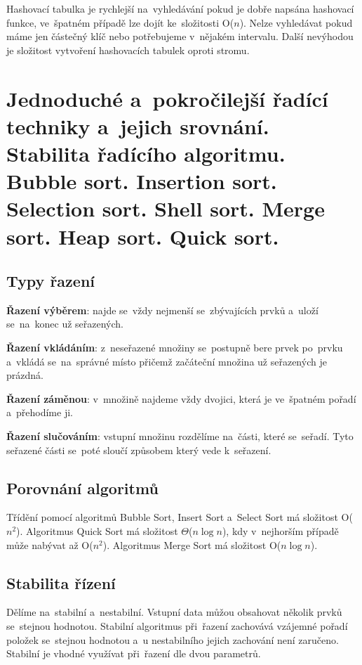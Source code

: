 Hashovací tabulka je rychlejší na~vyhledávání pokud je dobře napsána hashovací funkce, ve~špatném případě lze dojít ke~složitosti O(\( n \)). Nelze vyhledávat pokud máme jen částečný klíč nebo potřebujeme v~nějakém intervalu. Další nevýhodou je složitost vytvoření hashovacích tabulek oproti stromu.

\clearpage
\section{Jednoduché a~pokročilejší řadící techniky a~jejich srovnání. Stabilita řadícího algoritmu. Bubble sort. Insertion sort. Selection sort. Shell sort. Merge sort. Heap sort. Quick sort.}

\subsection{Typy řazení}

\textbf{Řazení výběrem}: najde se~vždy nejmenší se~zbývajících prvků a~uloží se~na~konec už seřazených.

\textbf{Řazení vkládáním}: z~neseřazené množiny se~postupně bere prvek po~prvku a~vkládá se~na~správné místo přičemž začáteční množina už seřazených je prázdná.

\textbf{Řazení záměnou}: v~množině najdeme vždy dvojici, která je ve~špatném pořadí a~přehodíme ji.

\textbf{Řazení slučováním}: vstupní množinu rozdělíme na~části, které se~seřadí. Tyto seřazené části se~poté sloučí způsobem který vede k~seřazení.

\subsection{Porovnání algoritmů}

Třídění pomocí algoritmů Bubble Sort, Insert Sort a~Select Sort má složitost O(\( n^2 \)). Algoritmus Quick Sort má složitost \( \Theta \)(\( n\log{n} \)), kdy v~nejhorším případě může nabývat až O(\( n^2 \)). Algoritmus Merge Sort má složitost O(\( n\log{n} \)).

\subsection{Stabilita řízení}

Dělíme na~stabilní a~nestabilní. Vstupní data můžou obsahovat několik prvků se~stejnou hodnotou. Stabilní algoritmus při~řazení zachovává vzájemné pořadí položek se~stejnou hodnotou a~u nestabilního jejich zachování není zaručeno. Stabilní je vhodné využívat při~řazení dle dvou parametrů.

